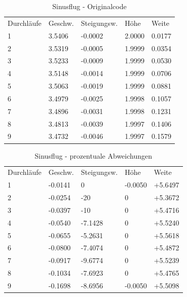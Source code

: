 \documentclass[a4paper,12pt]{scrartcl}
\begin{document}
\begin{table}
\centering
\caption{Sinusflug - Originalcode}
\begin{tabular}{lllll}
Durchläufe & Geschw. & Steigungsw. & Höhe   & Weite   \\
1          & 3.5406  & -0.0002     & 2.0000 & 0.0177  \\
2          & 3.5319  & -0.0005     & 1.9999 & 0.0354  \\
3          & 3.5233  & -0.0009     & 1.9999 & 0.0530  \\
4          & 3.5148  & -0.0014     & 1.9999 & 0.0706  \\
5          & 3.5063  & -0.0019     & 1.9999 & 0.0881  \\
6          & 3.4979  & -0.0025     & 1.9998 & 0.1057  \\
7          & 3.4896  & -0.0031     & 1.9998 & 0.1231  \\
8          & 3.4813  & -0.0039     & 1.9997 & 0.1406  \\
9          & 3.4732  & -0.0046     & 1.9997 & 0.1579 
\end{tabular}
\end{table}
\begin{table}
\centering
\caption{Sinusflug - prozentuale Abweichungen}
\begin{tabular}{lllll}
Durchläufe & Geschw. & Steigungsw. & Höhe   & Weite   \\
1          & -0.0141  &  0    & -0.0050 & +5.6497   \\
2          & -0.0254  &  -20    & 0 & +5.3672  \\
3          & -0.0397  &  -10    & 0 &  +5.4716 \\
4          & -0.0540  &   -7.1428   & 0 & +5.5240  \\
5          & -0.0655  &   -5.2631   & 0 &  +5.5618 \\
6          & -0.0800  &   -7.4074   &  0&   +5.4872\\
7          & -0.0917  &   -9.6774   &  0&   +5.5239\\
8          & -0.1034  &   -7.6923   &  0&   +5.4765\\
9          & -0.1698  &   -8.6956   & -0.0050 &  +5.5098
\end{tabular}
\end{table}
\end{document}
